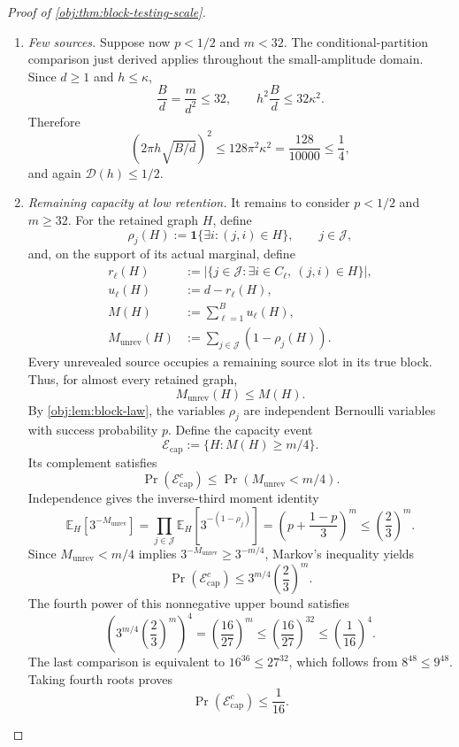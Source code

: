 \documentclass[11pt]{article}
\begin{document}
\begin{proof}[Proof of \cref{obj:thm:block-testing-scale}]
\begin{enumerate}
Since \(p>0\), the definition of \(s\) also gives
\[
h\sqrt{mp}\le\kappa d,
\qquad
h^2mp\le\kappa^2d^2.
\]
Using \(p\ge1/2\) and \(m=Bd\), we obtain
\[
h^2\frac Bd
=\frac{h^2m}{d^2}
\le2\kappa^2.
\]
The required constant calibration is
\[
\left(2\pi h\sqrt{B/d}\right)^2
\le8\pi^2\kappa^2
=\frac8{10000}
\le\frac14.
\]
The quantity being squared is nonnegative, so \(\mathcal D(h)\le1/2\).

\item \textit{Few sources.}
Suppose now \(p<1/2\) and \(m<32\). The conditional-partition comparison just derived applies throughout the small-amplitude domain. Since \(d\ge1\) and \(h\le\kappa\),
\[
\frac Bd=\frac{m}{d^2}\le32,
\qquad
h^2\frac Bd\le32\kappa^2.
\]
Therefore
\[
\left(2\pi h\sqrt{B/d}\right)^2
\le128\pi^2\kappa^2
=\frac{128}{10000}
\le\frac14,
\]
and again \(\mathcal D(h)\le1/2\).

\item \textit{Remaining capacity at low retention.}
It remains to consider \(p<1/2\) and \(m\ge32\). For the retained graph \(H\), define
\[
\rho_j(H):=\mathbf1\{\exists i:(j,i)\in H\},
\qquad j\in\mathcal J,
\]
and, on the support of its actual marginal, define
\[
\begin{aligned}
r_\ell(H)&:=
\bigl|\{j\in\mathcal J:\exists i\in C_\ell,\ (j,i)\in H\}\bigr|,\\
u_\ell(H)&:=d-r_\ell(H),\\
M(H)&:=\sum_{\ell=1}^{B}u_\ell(H),\\
M_{\mathrm{unrev}}(H)&:=\sum_{j\in\mathcal J}(1-\rho_j(H)).
\end{aligned}
\]
Every unrevealed source occupies a remaining source slot in its true block. Thus, for almost every retained graph,
\[
M_{\mathrm{unrev}}(H)\le M(H).
\]
By \cref{obj:lem:block-law}, the variables \(\rho_j\) are independent Bernoulli variables with success probability \(p\). Define the capacity event
\[
\mathcal E_{\mathrm{cap}}:=\{H:M(H)\ge m/4\}.
\]
Its complement satisfies
\[
\Pr(\mathcal E_{\mathrm{cap}}^c)
\le\Pr(M_{\mathrm{unrev}}<m/4).
\]
Independence gives the inverse-third moment identity
\[
\mathbb E_H[3^{-M_{\mathrm{unrev}}}]
=
\prod_{j\in\mathcal J}\mathbb E_H[3^{-(1-\rho_j)}]
=
\left(p+\frac{1-p}{3}\right)^m
\le\left(\frac23\right)^m.
\]
Since \(M_{\mathrm{unrev}}<m/4\) implies
\(3^{-M_{\mathrm{unrev}}}\ge3^{-m/4}\), Markov's inequality yields
\[
\Pr(\mathcal E_{\mathrm{cap}}^c)
\le
3^{m/4}\left(\frac23\right)^m.
\]
The fourth power of this nonnegative upper bound satisfies
\[
\left(3^{m/4}\left(\frac23\right)^m\right)^4
=
\left(\frac{16}{27}\right)^m
\le
\left(\frac{16}{27}\right)^{32}
\le
\left(\frac1{16}\right)^4.
\]
The last comparison is equivalent to
\(16^{36}\le27^{32}\), which follows from \(8^{48}\le9^{48}\). Taking fourth roots proves
\[
\Pr(\mathcal E_{\mathrm{cap}}^c)\le\frac1{16}.
\]


\end{enumerate}
\end{proof}
\end{document}
